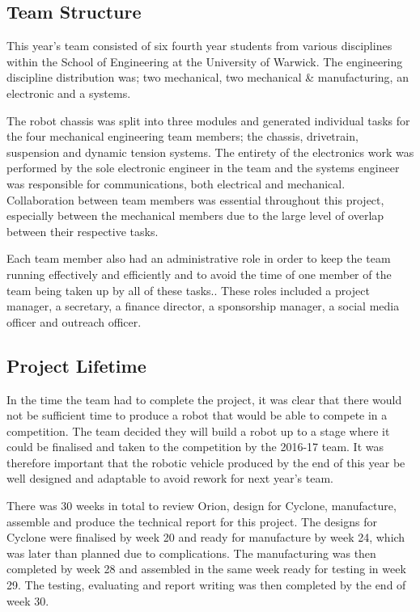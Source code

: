 \subsection{Team Structure}
This year’s team consisted of six fourth year students from various disciplines within the School of Engineering at the University of Warwick. The engineering discipline distribution was; two mechanical, two mechanical \& manufacturing, an electronic and a systems. \par
The robot chassis was split into three modules and generated  individual tasks for the four mechanical engineering team members; the chassis, drivetrain, suspension and dynamic tension systems. The entirety of the electronics work was performed by the sole electronic engineer in the team and the systems engineer was responsible for communications, both electrical and mechanical. Collaboration between team members was essential throughout this project, especially between the mechanical members due to the large level of overlap between their respective tasks. \par
Each team member also had an administrative role in order to keep the team running effectively and efficiently and to avoid the time of one member of the team being taken up by all of these tasks.. These roles included a project manager, a secretary, a finance director, a sponsorship manager, a social media officer and outreach officer. \par
\subsection{Project Lifetime}
In the time the team had to complete the project, it was clear that there would not be sufficient time to produce a robot that would be able to compete in a competition. The team decided they will build a robot up to a stage where it could be finalised and taken to the competition by the 2016-17 team. It was therefore important that the robotic vehicle produced by the end of this year be well designed and adaptable to avoid rework for next year’s team. \par
There was 30 weeks in total to review Orion, design for Cyclone, manufacture, assemble and produce the technical report for this project. The designs for Cyclone were finalised by week 20 and ready for manufacture by week 24, which was later than planned due to complications. The manufacturing was then completed by week 28 and assembled in the same week ready for testing in week 29. The testing, evaluating and report writing was then completed by the end of week 30. \par
